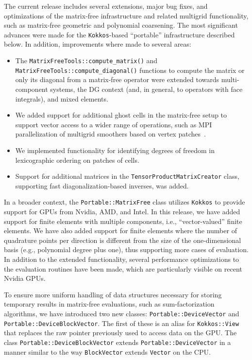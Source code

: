 \documentclass{ansarticle-preprint}
\newcommand{\specialword}[1]{\texttt{#1}}
\newcommand{\kokkos}{{\specialword{Kokkos}}\xspace}
\begin{document}
The current release includes several extensions, major bug fixes, and optimizations of the
matrix-free infrastructure and related multigrid functionality, such as
matrix-free geometric and polynomial coarsening. The most significant advances were made for the \kokkos-based
``portable'' infrastructure described below. In addition, improvements where
made to several areas:
\begin{itemize}
\item The \texttt{MatrixFreeTools::compute\_matrix()} and
  \texttt{MatrixFreeTools::compute\_diagonal()} functions to compute the
  matrix or only its diagonal from a matrix-free operator were extended
  towards multi-component systems, the DG context (and, in general, to operators
  with face integrals), and mixed elements.
\item We added support for additional ghost cells in the matrix-free setup to
  support vector access to a wider range of operations, such as MPI
  parallelization of multigrid smoothers based on vertex
  patches~\cite{Wichrowski2025smoothers}.
\item We implemented functionality for identifying degrees of freedom in lexicographic
  ordering on patches of cells.
\item Support for additional matrices in the
  \texttt{TensorProductMatrixCreator} class, supporting fast
  diagonalization-based inverses, was added.
\end{itemize}

In a broader context, the
\texttt{Portable::MatrixFree} class utilizes \kokkos to provide support for GPUs from
Nvidia, AMD, and Intel. In this release, we have added support for finite
elements with multiple components, i.e., ``vector-valued'' finite elements. We have
also added support for finite elements where the number
of quadrature points per direction is different from the size of the
one-dimensional basis (e.g., polynomial degree plus one), thus supporting more
cases of evaluation. In addition to the extended functionality, several
performance optimizations to the evaluation routines have been made, which are
particularly visible on recent Nvidia GPUs.

To ensure more uniform handling of data structures necessary for
storing temporary results in matrix-free evaluations, such as
sum-factorization algorithms, we have introduced two new classes:
\texttt{Portable::DeviceVector} and
\texttt{Portable::DeviceBlockVector}. The first of these is an
alias for \texttt{Kokkos::View} that replaces the raw pointer previously used
to access data on the GPU. The class \texttt{Portable::DeviceBlockVector} extends
\texttt{Portable::DeviceVector} in a manner similar to the way
\texttt{BlockVector} extends \texttt{Vector} on the CPU.
\end{document}
